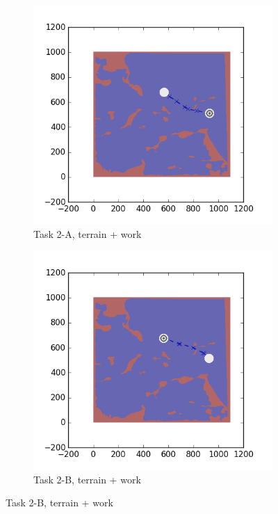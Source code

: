 \documentclass{tamuccthesis}
\begin{document}
\begin{figure}[H]
    \begin{subfigure}[b]{0.4\textwidth}
        \centering
        \includegraphics[width=\textwidth,trim={4cm 3cm 2cm 3cm},clip]{EXP3RG_PathBa_-1_-1_-1_0.png}
        \caption{Task 2-A, terrain + work}
        \label{fig:Path_2-A_terrain_work}
    \end{subfigure}
    \hfill
    \begin{subfigure}[b]{0.4\textwidth}  
        \centering 
        \includegraphics[width=\textwidth,trim={4cm 3cm 2cm 3cm},clip]{EXP3RG_PathBb_-1_-1_-1_0.png}
        \caption{Task 2-B, terrain + work}   
        \label{fig:Path_2-B_terrain_work}
    \end{subfigure}


\end{figure}
\end{document}
